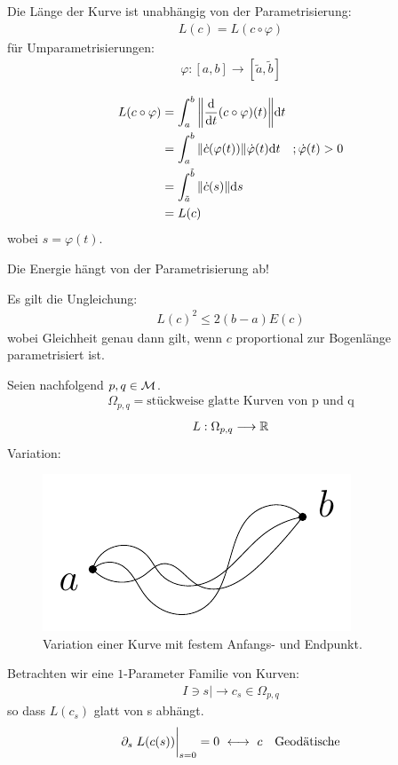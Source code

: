 \begin{bem}
Die Länge der Kurve ist unabhängig von der Parametrisierung:
\begin{align}
L(c) = L(c \circ \varphi)
\end{align}
für Umparametrisierungen:
\begin{align*}
\varphi: [a, b] \longrightarrow [\tilde{a}, \tilde{b}]
\end{align*}
\end{bem}
\begin{bew}
\begin{align*}
L(c \circ \varphi) &= \int_{a}^{b} \norm{\frac{\dd}{\dd t} (c \circ \varphi)(t)} \dd t \\
&= \int_{a}^{b} \norm{\dot{c}(\varphi(t))} \dot{\varphi}(t) \dd t \quad ;\dot{\varphi}(t) > 0 \\
&= \int_{\tilde{a}}^{\tilde{b}} \norm{\dot{c}(s)} \dd s \\
&= L(c)
\end{align*}
wobei $s=\varphi(t)$.
\end{bew}
\begin{bem}
Die Energie hängt von der Parametrisierung ab!
\end{bem}
\begin{lem}
Es gilt die Ungleichung:
\begin{align}
L(c)^2 \leq 2(b-a)E(c)
\end{align}
wobei Gleichheit genau dann gilt, wenn $c$ proportional zur Bogenlänge parametrisiert ist.
\end{lem}
Seien nachfolgend $p, q \in \mathcal{M}$. 
\begin{align*}
\Omega_{p, q} = {\text{stückweise glatte Kurven von p und q}}
\end{align*} 
\begin{align*}
L: \Omega_{p, q} \longrightarrow \mathbb{R}
\end{align*}
Variation:
\begin{figure}[H]
\centering
\includegraphics[width=0.35\linewidth]{figures/tikz/variation.pdf}
\caption{Variation einer Kurve mit festem Anfangs- und Endpunkt.}
\label{img:variation}
\end{figure} 
Betrachten wir eine $1$-Parameter Familie von Kurven:
\begin{align*}
I \ni s |\longrightarrow c_s \in \Omega_{p, q}
\end{align*}
so dass $L(c_s)$ glatt von s abhängt.
\begin{align*}
\partial_s\eval{L(c(s))}_{s=0} = 0 \  \longleftrightarrow \ c \quad \text{Geodätische}
\end{align*}

